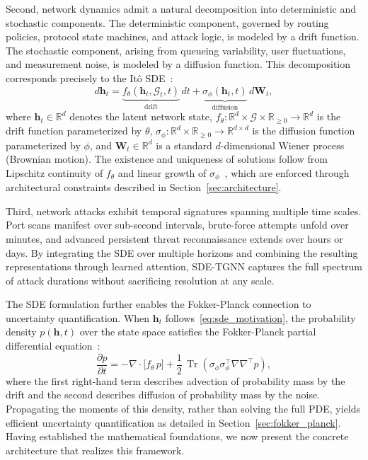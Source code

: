 \documentclass[journal]{IEEEtran}
\newcommand{\R}{\mathbb{R}}
\newcommand{\G}{\mathcal{G}}
\DeclareMathOperator{\Tr}{Tr}
\begin{document}
Second, network dynamics admit a natural decomposition into deterministic and stochastic components. The deterministic component, governed by routing policies, protocol state machines, and attack logic, is modeled by a drift function. The stochastic component, arising from queueing variability, user fluctuations, and measurement noise, is modeled by a diffusion function. This decomposition corresponds precisely to the It\^{o} SDE~\cite{oksendal2003sde}:
\begin{equation}
d\mathbf{h}_t = \underbrace{f_\theta(\mathbf{h}_t, \G_t, t)}_{\text{drift}}\,dt + \underbrace{\sigma_\phi(\mathbf{h}_t, t)}_{\text{diffusion}}\,d\mathbf{W}_t,
\label{eq:sde_motivation}
\end{equation}
where $\mathbf{h}_t \in \R^d$ denotes the latent network state, $f_\theta : \R^d \times \G \times \R_{\ge 0} \to \R^d$ is the drift function parameterized by $\theta$, $\sigma_\phi : \R^d \times \R_{\ge 0} \to \R^{d \times d}$ is the diffusion function parameterized by $\phi$, and $\mathbf{W}_t \in \R^d$ is a standard $d$-dimensional Wiener process (Brownian motion). The existence and uniqueness of solutions follow from Lipschitz continuity of $f_\theta$ and linear growth of $\sigma_\phi$~\cite{oksendal2003sde}, which are enforced through architectural constraints described in Section~\ref{sec:architecture}.

Third, network attacks exhibit temporal signatures spanning multiple time scales. Port scans manifest over sub-second intervals, brute-force attempts unfold over minutes, and advanced persistent threat reconnaissance extends over hours or days. By integrating the SDE over multiple horizons and combining the resulting representations through learned attention, SDE-TGNN captures the full spectrum of attack durations without sacrificing resolution at any scale.

The SDE formulation further enables the Fokker-Planck connection to uncertainty quantification. When $\mathbf{h}_t$ follows~\eqref{eq:sde_motivation}, the probability density $p(\mathbf{h}, t)$ over the state space satisfies the Fokker-Planck partial differential equation~\cite{risken1989fpe}:
\begin{equation}
\frac{\partial p}{\partial t} = -\nabla \cdot \!\big[f_\theta \, p\big] + \frac{1}{2}\,\Tr\!\left(\sigma_\phi \sigma_\phi^\top \nabla \nabla^\top p\right),
\label{eq:fp_intro}
\end{equation}
where the first right-hand term describes advection of probability mass by the drift and the second describes diffusion of probability mass by the noise. Propagating the moments of this density, rather than solving the full PDE, yields efficient uncertainty quantification as detailed in Section~\ref{sec:fokker_planck}. Having established the mathematical foundations, we now present the concrete architecture that realizes this framework.
\end{document}
